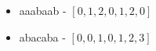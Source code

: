 
\begin{itemize}[noitemsep]
  \item aaabaab - $[0, 1, 2, 0, 1, 2, 0]$
  \item abacaba - $[0, 0, 1, 0, 1, 2, 3]$
\end{itemize}
